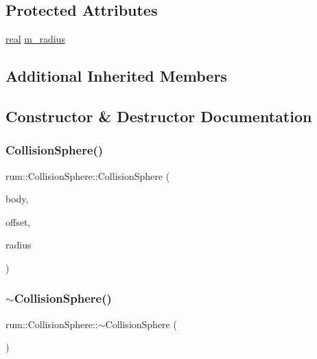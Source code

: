 \subsection*{Protected Attributes}
\begin{DoxyCompactItemize}
\item 
\mbox{\hyperlink{namespacerum_a7e8cca23573d5eaead0f138cbaa4862c}{real}} \mbox{\hyperlink{classrum_1_1_collision_sphere_a191922b8ffb7ea87aa1caf915c563aad}{m\+\_\+radius}}
\end{DoxyCompactItemize}
\subsection*{Additional Inherited Members}


\subsection{Constructor \& Destructor Documentation}
\mbox{\label{classrum_1_1_collision_sphere_a5697b121eec9538a48cb6b42d10de9a0}} 
\subsubsection{\texorpdfstring{Collision\+Sphere()}{CollisionSphere()}}
{\footnotesize\ttfamily rum\+::\+Collision\+Sphere\+::\+Collision\+Sphere (\begin{DoxyParamCaption}\item[{\mbox{\hyperlink{classrum_1_1_rigid_body}{Rigid\+Body}} $\ast$}]{body,  }\item[{const glm\+::mat4 \&}]{offset,  }\item[{\mbox{\hyperlink{namespacerum_a7e8cca23573d5eaead0f138cbaa4862c}{real}}}]{radius }\end{DoxyParamCaption})}

\mbox{\label{classrum_1_1_collision_sphere_a6e3be5263f114a38ecb3bbf9b97ba8df}} 
\subsubsection{\texorpdfstring{$\sim$\+Collision\+Sphere()}{~CollisionSphere()}}
{\footnotesize\ttfamily rum\+::\+Collision\+Sphere\+::$\sim$\+Collision\+Sphere (\begin{DoxyParamCaption}{ }\end{DoxyParamCaption})\hspace{0.3cm}{\ttfamily [default]}}



